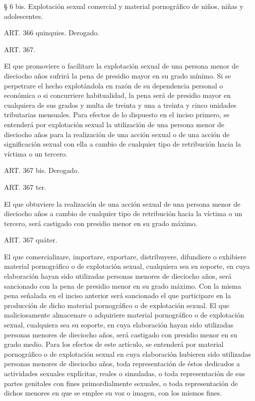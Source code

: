     § 6 bis. Explotación sexual comercial y material pornográfico de niños, niñas y adolescentes.

    ART. 366 quinquies. Derogado.




    ART. 367.

    El que promoviere o facilitare la explotación sexual de una persona menor de dieciocho años sufrirá la pena de presidio mayor en su grado mínimo.
    Si se perpetrare el hecho explotándola en razón de su dependencia personal o económica o si concurriere habitualidad, la pena será de presidio mayor en cualquiera de sus grados y multa de treinta y una a treinta y cinco unidades tributarias mensuales.
    Para efectos de lo dispuesto en el inciso primero, se entenderá por explotación sexual la utilización de una persona menor de dieciocho años para la realización de una acción sexual o de una acción de significación sexual con ella a cambio de cualquier tipo de retribución hacia la víctima o un tercero.

    ART. 367 bis.    Derogado.


    ART. 367 ter.

    El que obtuviere la realización de una acción sexual de una persona menor de dieciocho años a cambio de cualquier tipo de retribución hacia la víctima o un tercero, será castigado con presidio menor en su grado máximo.


    ART. 367 quáter.

    El que comercializare, importare, exportare, distribuyere, difundiere o exhibiere material pornográfico o de explotación sexual, cualquiera sea su soporte, en cuya elaboración hayan sido utilizadas personas menores de dieciocho años, será sancionado con la pena de presidio menor en su grado máximo.
    Con la misma pena señalada en el inciso anterior será sancionado el que participare en la producción de dicho material pornográfico o de explotación sexual.
    El que maliciosamente almacenare o adquiriere material pornográfico o de explotación sexual, cualquiera sea su soporte, en cuya elaboración hayan sido utilizadas personas menores de dieciocho años, será castigado con presidio menor en su grado medio.
    Para los efectos de este artículo, se entenderá por material pornográfico o de explotación sexual en cuya elaboración hubieren sido utilizadas personas menores de dieciocho años, toda representación de éstos dedicados a actividades sexuales explícitas, reales o simuladas, o toda representación de sus partes genitales con fines primordialmente sexuales, o toda representación de dichos menores en que se emplee su voz o imagen, con los mismos fines.


